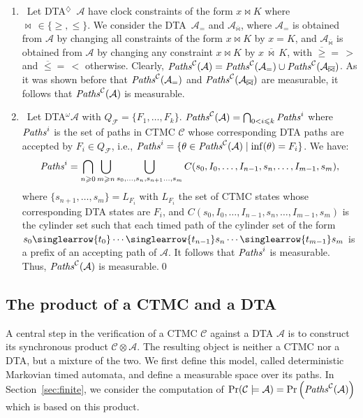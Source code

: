 \documentclass{LMCS}
\newcommand{\mc}[1]{\mathcal{#1}}
\newcommand{\<}{\langle}
\renewcommand{\>}{\rangle}
\newcommand{\les}{\leqslant}
\newcommand{\ges}{\geqslant}
\newcommand{\mC}{\mathcal{C}}
\newcommand{\mA}{\mathcal{A}}
\newcommand{\mF}{\mathcal{F}}
\newcommand{\DTA}{\textsc{DTA}}
\newcommand{\DTAr}{\DTA$^{\!\Ever}$}
\newcommand{\DTAo}{\DTA$^{\omega}$}
\newcommand{\mv}[1]{\singlearrow{#1}}
\newcommand{\Paths}{{\it Paths}}
\newcommand{\Path}{{\it Paths}}
\newcommand{\F}{\mathop{\diamondsuit}}
\newcommand{\Ever}{\F}
\begin{document}
\begin{enumerate}
\item{}\
Let \DTAr\ $\mc{A}$ have clock constraints of the form $x \bowtie K$ where $\bowtie
\, \in \{\geq, \leq\}$.
We consider the \DTA\ $\mc{A}_=$ and $\mc{A}_{\overline{\bowtie}}$, where $\mc{A}_=$
is obtained from $\mc{A}$ by changing all constraints of the form $x \bowtie K$ by
$x = K$, and $\mc{A}_{\overline{\bowtie}}$ is obtained from $\mc{A}$ by changing any
constraint $x \bowtie K$ by $x \, \overline{\bowtie} \, K$, with $\overline{\geq} = \, >$
and $\overline{\leq} = \, <$ otherwise.
Clearly, $\Paths^\mc{C}(\mc{A}) = \Paths^\mc{C}(\mc{A}_{=}) \cup \Paths^\mc{C}(\mc{A}_{\overline{\bowtie}})$.
As it was shown before that $\Paths^\mc{C}(\mc{A}_{=})$ and $\Paths^\mc{C}(\mc{A}_{\overline{\bowtie}})$ are measurable, it follows that $\Paths^\mc{C}(\mc{A})$
is measurable.
\item{}\
Let \DTAo $\mc{A}$ with $Q_\mF=\{F_1, \ldots ,F_k\}$.
$\Path^\mC (\mA) = \bigcap_{0 < i \les k}\Path^i$ where $\Path^i$ is the set of paths
in CTMC $\mC$ whose corresponding DTA paths are accepted by $F_i \in Q_\mF$, i.e., $\Path^i = \{\theta \in \Path^\mC(\mA) \mid \inf(\theta) = F_i\}$.
We have:
$$
\Path^i = \bigcap_{n\ges 0} \bigcup_{m\ges n} \bigcup_{s_0, \ldots, s_n,s_{n{+}1}
\ldots, s_m} C(s_0, I_0, \ldots, I_{n{-}1}, s_n, \ldots, I_{m{-}1}, s_m),
$$
where $\{s_{n+1}, \ldots ,s_m\}= L_{F_i}$ with $L_{F_i}$ the set of CTMC states whose
corresponding DTA states are $F_i$, and $C(s_0, I_0, \ldots, I_{n-1}, s_n, \ldots, I_{m-1},
s_m)$ is the cylinder set such that each timed path of the cylinder set of the form $s_0
\mv{t_0} \cdots \mv{t_{n-1}} s_n \cdots \mv{t_{m-1}} s_m$ is a prefix of an accepting
path of $\mA$.
It follows that $\Path^i$ is measurable.
Thus, $\Paths^\mc{C}(\mc{A})$ is measurable.\qed
\end{enumerate}



\subsection{The product of a CTMC and a DTA}\label{sec:big_product}
A central step in the verification of a CTMC $\mc{C}$ against a DTA $\mc{A}$ is
to construct its synchronous product $\mc{C} \otimes \mc{A}$.  The resulting
object is neither a CTMC nor a DTA, but a mixture of the two.  We first define this
model, called deterministic Markovian timed automata, and define a measurable
space over its paths.  In Section~\ref{sec:finite}, we consider
the computation of $\Pr(\mC \models \mA) = \Pr\left( \Paths^\mc{C}(\mc{A}) \right)$
which is based on this product.
\end{document}
